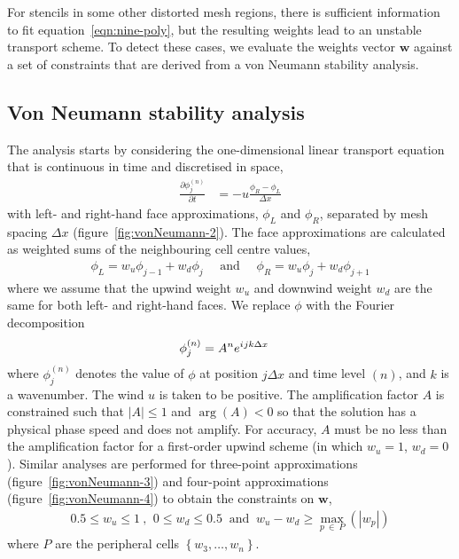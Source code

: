 \documentclass[a4paper,11pt]{article}
\newcommand{\iu}{{i\mkern1mu}}
\begin{document}
For stencils in some other distorted mesh regions, there is sufficient information to fit equation~\eqref{eqn:nine-poly}, but the resulting weights lead to an unstable transport scheme.  To detect these cases, we evaluate the weights vector $\mathbf{w}$ against a set of constraints that are derived from a von Neumann stability analysis.

\subsection*{Von Neumann stability analysis}
The analysis starts by considering the one-dimensional linear transport equation that is continuous in time and discretised in space,
\begin{align}
	\frac{\partial \phi^{(n)}_j}{\partial t} &= -u \frac{\phi_R - \phi_L}{\Delta x}
\end{align}
with left- and right-hand face approximations, $\phi_L$ and $\phi_R$, separated by mesh spacing $\Delta x$ (figure~\ref{fig:vonNeumann-2}).  The face approximations are calculated as weighted sums of the neighbouring cell centre values,
\begin{align}
	\phi_L = w_u \phi_{j-1} + w_d \phi_j \quad \text{ and } \quad \phi_R = w_u \phi_j + w_d \phi_{j+1}
\end{align}
where we assume that the upwind weight $w_u$ and downwind weight $w_d$ are the same for both left- and right-hand faces.  We replace $\phi$ with the Fourier decomposition 
\begin{align}
	\phi_j^{(n)} &= A^n e^{\iu j k \Delta x}
\end{align}
where $\phi_j^{(n)}$ denotes the value of $\phi$ at position $j \Delta x$ and time level $(n)$, and $k$ is a wavenumber.  The wind $u$ is taken to be positive.  The amplification factor $A$ is constrained such that $|A| \leq 1$ and $\arg(A) < 0$ so that the solution has a physical phase speed and does not amplify.  For accuracy, $A$ must be no less than the amplification factor for a first-order upwind scheme (in which $w_u = 1$, $w_d = 0$).  Similar analyses are performed for three-point approximations (figure~\ref{fig:vonNeumann-3}) and four-point approximations (figure~\ref{fig:vonNeumann-4}) to obtain the constraints on $\mathbf{w}$,
\begin{align}
	0.5 \leq w_u \leq 1 \ \text{, } \ 
	0 \leq w_d \leq 0.5 \ \text{ and }\ 
	w_u - w_d \geq \max_{p\:\in\:P}(|w_p|)
\end{align}
where $P$ are the peripheral cells $\left\{ w_3, \ldots, w_n \right\}$.
\end{document}
